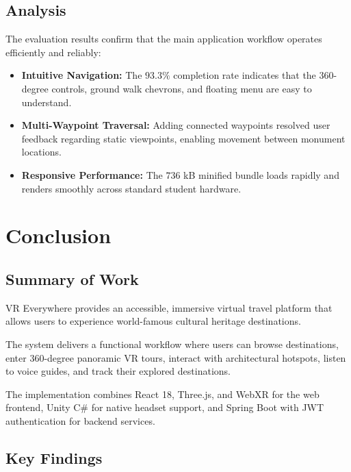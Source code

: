 \documentclass{tietreport}
\begin{document}
\section{Analysis}

The evaluation results confirm that the main application workflow operates efficiently and reliably:

\begin{itemize}
  \item \textbf{Intuitive Navigation:} The $93.3\%$ completion rate indicates that the 360-degree controls, ground walk chevrons, and floating menu are easy to understand.
  \item \textbf{Multi-Waypoint Traversal:} Adding connected waypoints resolved user feedback regarding static viewpoints, enabling movement between monument locations.
  \item \textbf{Responsive Performance:} The $736$ kB minified bundle loads rapidly and renders smoothly across standard student hardware.
\end{itemize}


\chapter{Conclusion}

\section{Summary of Work}

VR Everywhere provides an accessible, immersive virtual travel platform that allows users to experience world-famous cultural heritage destinations.

The system delivers a functional workflow where users can browse destinations, enter 360-degree panoramic VR tours, interact with architectural hotspots, listen to voice guides, and track their explored destinations.

The implementation combines React 18, Three.js, and WebXR for the web frontend, Unity C\# for native headset support, and Spring Boot with JWT authentication for backend services.

\section{Key Findings}
\end{document}
